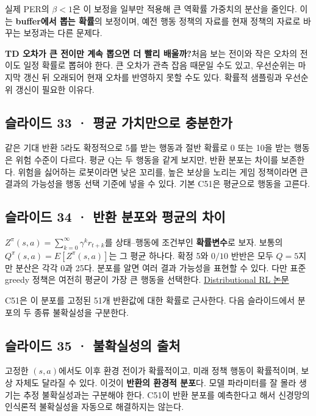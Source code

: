 \documentclass[11pt,a4paper]{article}
\begin{document}
실제 PER의 $\beta<1$은 이 보정을 일부만 적용해 큰 역확률 가중치의 분산을 줄인다. 이는 \textbf{buffer에서 뽑는 확률}의 보정이며, 예전 행동 정책의 자료를 현재 정책의 자료로 바꾸는 보정과는 다른 문제다.\par

\par\medskip\noindent\textbf{TD 오차가 큰 전이만 계속 뽑으면 더 빨리 배울까?}\quad 처음 보는 전이와 작은 오차의 전이도 일정 확률로 뽑혀야 한다. 큰 오차가 관측 잡음 때문일 수도 있고, 우선순위는 마지막 갱신 뒤 오래되어 현재 오차를 반영하지 못할 수도 있다. 확률적 샘플링과 우선순위 갱신이 필요한 이유다.\par

\subsection{슬라이드 33 · 평균 가치만으로 충분한가}

같은 기대 반환 5라도 확정적으로 5를 받는 행동과 절반 확률로 0 또는 10을 받는 행동은 위험 수준이 다르다. 평균 Q는 두 행동을 같게 보지만, 반환 분포는 차이를 보존한다. 위험을 싫어하는 로봇이라면 낮은 꼬리를, 높은 보상을 노리는 게임 정책이라면 큰 결과의 가능성을 행동 선택 기준에 넣을 수 있다. 기본 C51은 평균으로 행동을 고른다.\par

\subsection{슬라이드 34 · 반환 분포와 평균의 차이}

$Z^\pi(s,a)=\sum_{k=0}^\infty\gamma^k r_{t+k}$를 상태–행동에 조건부인 \textbf{확률변수}로 보자. 보통의 $Q^\pi(s,a)=E[Z^\pi(s,a)]$는 그 평균 하나다. 확정 5와 $0/10$ 반반은 모두 $Q=5$지만 분산은 각각 0과 25다. 분포를 알면 여러 결과 가능성을 표현할 수 있다. 다만 표준 greedy 정책은 여전히 평균이 가장 큰 행동을 선택한다. \href{https://arxiv.org/abs/1707.06887}{Distributional RL 논문}\par

C51은 이 분포를 고정된 51개 반환값에 대한 확률로 근사한다. 다음 슬라이드에서 분포의 두 종류 불확실성을 구분한다.\par

\subsection{슬라이드 35 · 불확실성의 출처}

고정한 $(s,a)$에서도 이후 환경 전이가 확률적이고, 미래 정책 행동이 확률적이며, 보상 자체도 달라질 수 있다. 이것이 \textbf{반환의 환경적 분포}다. 모델 파라미터를 잘 몰라 생기는 추정 불확실성과는 구분해야 한다. C51이 반환 분포를 예측한다고 해서 신경망의 인식론적 불확실성을 자동으로 해결하지는 않는다.\par
\end{document}
